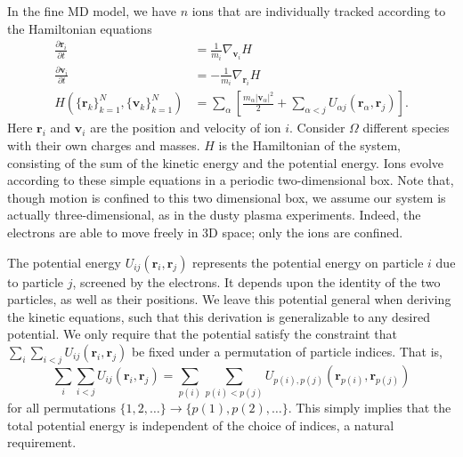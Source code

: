 \documentclass{article}
\begin{document}
In the fine MD model, we have $n$ ions that are individually tracked according to the Hamiltonian equations
\begin{equation}
\begin{split}
\frac{\partial \mathbf{r}_i}{\partial t}&=\frac{1}{m_i}\nabla_{\mathbf{v}_i} H\\
\frac{\partial \mathbf{v}_i}{\partial t}&=-\frac{1}{m_i}\nabla_{\mathbf{r}_i}H\\
H(\{\mathbf{r}_k\}_{k=1}^N,\{\mathbf{v}_k\}_{k=1}^N)&=\sum_\alpha\left[\frac{m_\alpha|\mathbf{v}_\alpha|^2}{2}+\sum_{\alpha<j}U_{\alpha j}(\mathbf{r}_\alpha,\mathbf{r}_j)\right].
\end{split}\label{eq:MD}
\end{equation}Here $\mathbf{r}_i$ and $\mathbf{v}_i$ are the position and velocity of ion $i$. Consider $\Omega$ different species with their own charges and masses. $H$ is the Hamiltonian of the system, consisting of the sum of the kinetic energy and the potential energy. Ions evolve according to these simple equations in a periodic two-dimensional box. Note that, though motion is confined to this two dimensional box, we assume our system is actually three-dimensional, as in the dusty plasma experiments. Indeed, the electrons are able to move freely in 3D space; only the ions are confined.

The potential energy $U_{ij}(\mathbf{r}_i,\mathbf{r}_j)$ represents the potential energy on particle $i$ due to particle $j$, screened by the electrons. It depends upon the identity of the two particles, as well as their positions. We leave this potential general when deriving the kinetic equations, such that this derivation is generalizable to any desired potential. We only require that the potential satisfy the constraint that $\sum_i\sum_{i<j}U_{ij}(\mathbf{r}_i,\mathbf{r}_j)$ be fixed under a permutation of particle indices. That is,
\[\sum_i\sum_{i<j} U_{ij}(\mathbf{r}_i,\mathbf{r}_j)=\sum_{p(i)}\sum_{p(i)<p(j)}U_{p(i),p(j)}(\mathbf{r}_{p(i)},\mathbf{r}_{p(j)})
\] for all permutations $\{1,2,\dots\}\to\{p(1),p(2),\dots\}$. This simply implies that the total potential energy is independent of the choice of indices, a natural requirement. 
\end{document}
